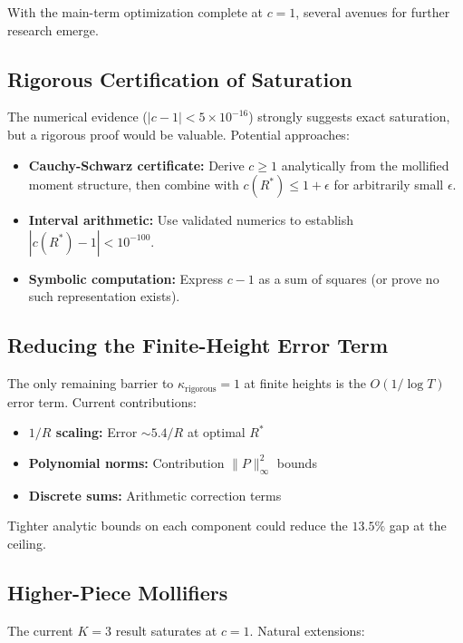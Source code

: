 \documentclass[11pt]{article}
\begin{document}
With the main-term optimization complete at $c = 1$, several avenues for further research emerge.

\subsection{Rigorous Certification of Saturation}

The numerical evidence ($|c - 1| < 5 \times 10^{-16}$) strongly suggests exact saturation, but a rigorous proof would be valuable. Potential approaches:

\begin{itemize}
\item \textbf{Cauchy-Schwarz certificate:} Derive $c \geq 1$ analytically from the mollified moment structure, then combine with $c(R^*) \leq 1 + \epsilon$ for arbitrarily small $\epsilon$.
\item \textbf{Interval arithmetic:} Use validated numerics to establish $|c(R^*) - 1| < 10^{-100}$.
\item \textbf{Symbolic computation:} Express $c - 1$ as a sum of squares (or prove no such representation exists).
\end{itemize}

\subsection{Reducing the Finite-Height Error Term}

The only remaining barrier to $\kappa_{\text{rigorous}} = 1$ at finite heights is the $O(1/\log T)$ error term. Current contributions:

\begin{itemize}
\item \textbf{$1/R$ scaling:} Error $\sim 5.4/R$ at optimal $R^*$
\item \textbf{Polynomial norms:} Contribution $\|P\|_{\infty}^2$ bounds
\item \textbf{Discrete sums:} Arithmetic correction terms
\end{itemize}

Tighter analytic bounds on each component could reduce the $13.5\%$ gap at the ceiling.

\subsection{Higher-Piece Mollifiers}

The current $K = 3$ result saturates at $c = 1$. Natural extensions:
\end{document}
